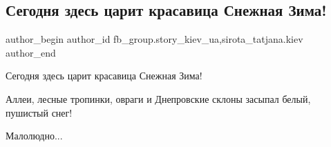  
 
 
 
 
 
\subsection{Сегодня здесь царит красавица Снежная Зима!}
\label{sec:09_01_2022.fb.fb_group.story_kiev_ua.2.krasavica_zima}
 
\ifcmt
 author_begin
   author_id fb_group.story_kiev_ua,sirota_tatjana.kiev
 author_end
\fi

Сегодня здесь царит красавица Снежная Зима!

Аллеи, лесные тропинки, овраги и Днепровские склоны засыпал белый, пушистый снег! 

Малолюдно...

